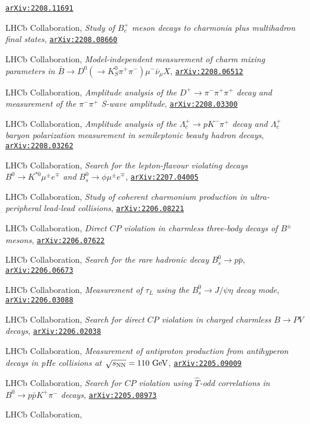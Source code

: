 \documentclass[a4paper, 11pt]{article}
\newenvironment{cvcontent}{
  \leftskip=0.5cm\rightskip=0cm
  \noindent\ignorespaces}{\par}
\newcommand{\arxiv}[1]{\href{https://arxiv.org/abs/#1}{\texttt{arXiv:#1}}}
\begin{document}
\begin{cvcontent}
\begin{enumerate}[label={[\arabic*]}, leftmargin=1.5cm]
    \arxiv{2208.11691}
    \item LHCb Collaboration,
    \emph{Study of $B_c^+$ meson decays to charmonia plus multihadron final states},
    \arxiv{2208.08660}
    \item LHCb Collaboration,
    \emph{Model-independent measurement of charm mixing parameters in $\bar{B} \rightarrow D^0 ( \rightarrow K_S^0 \pi^+ \pi^-) \mu^- \bar{\nu}_\mu X$},
    \arxiv{2208.06512}
    \item LHCb Collaboration,
    \emph{Amplitude analysis of the $D^+\to\pi^- \pi^+\pi^+$ decay and measurement of the $\pi^-\pi^+$ S-wave amplitude},
    \arxiv{2208.03300}
    \item LHCb Collaboration,
    \emph{Amplitude analysis of the $\Lambda^+_c\to pK^-\pi^+$ decay and $\Lambda^+_c$ baryon polarization measurement in semileptonic beauty hadron decays},
    \arxiv{2208.03262}
    \item LHCb Collaboration,
    \emph{Search for the lepton-flavour violating decays $B^0 \to K^{*0} \mu^\pm e^\mp$ and $B_s^0 \to \phi \mu^\pm e^\mp$},
    \arxiv{2207.04005}
    \item LHCb Collaboration,
    \emph{Study of coherent charmonium production in ultra-peripheral lead-lead collisions},
    \arxiv{2206.08221}
    \sloppy
    \item LHCb Collaboration,
    \emph{Direct $CP$ violation in charmless three-body decays of $B^{\pm}$ mesons},
    \arxiv{2206.07622}
    \item LHCb Collaboration,
    \emph{Search for the rare hadronic decay $B_s^0\to p \bar{p}$},
    \arxiv{2206.06673}
    \item LHCb Collaboration,
    \emph{Measurement of $\tau_{L}$ using the $B_{s}^{0} \to J/\psi \eta$ decay mode},
    \arxiv{2206.03088}
    \item LHCb Collaboration,
    \emph{Search for direct $CP$ violation in charged charmless $B \to PV$ decays},
    \arxiv{2206.02038}
    \item LHCb Collaboration,
    \emph{Measurement of antiproton production from antihyperon decays in pHe collisions at $\sqrt{s_{\rm{NN}}}=110~\rm{GeV}$},
    \arxiv{2205.09009}
    \item LHCb Collaboration,
    \emph{Search for $CP$ violation using $\hat{T}$-odd correlations in $B^{0} \to p \bar p K^{+} \pi^{-}$ decays},
    \arxiv{2205.08973}
    \item LHCb Collaboration,

\end{enumerate}
\end{cvcontent}
\end{document}
